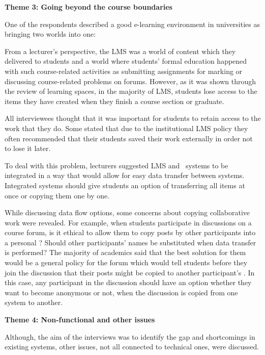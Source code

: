 \textbf{Theme 3: Going beyond the course boundaries}

One of the respondents described a good e-learning environment in universities
as bringing two worlds into one:


From a lecturer's perspective, the LMS was a world of content which they
delivered to students and a world where students' formal education happened with
such course-related activities as submitting assignments for marking or discussing
course-related problems on forums. However, as it was shown through the review
of learning spaces, in the majority of LMS, students lose access to the items
they have created when they finish a course section or graduate.

All interviewees thought that it was important for students to retain access to
the work that they do. Some stated that due to the institutional LMS policy they
often recommended that their students saved their work externally in order not
to lose it later.

To deal with this problem, lecturers suggested LMS and \ep~systems to be
integrated in a way that would allow for easy data transfer between systems.
Integrated systems should give students an option of transferring all items at
once or copying them one by one.

While discussing data flow options, some concerns about copying collaborative
work were revealed. For example, when students participate in discussions on a
course forum, is it ethical to allow them to copy posts by other participants
into a personal \ep? Should other participants' names be substituted when
data transfer is performed? The majority of academics said that the best
solution for them would be a general policy for the forum which would tell
students before they join the discussion that their posts might be copied to
another participant's \ep. In this case, any participant in the discussion
should have an option whether they want to become anonymous or not, when the
discussion is copied from one system to another.

\textbf{Theme 4: Non-functional and other issues}

Although, the aim of the interviews was to identify the gap and shortcomings in
existing systems, other issues, not all connected to technical ones, were
discussed.

